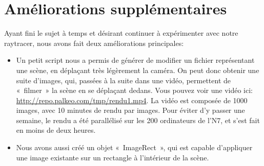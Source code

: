 \documentclass[a4paper]{article}
\begin{document}
\section{Améliorations supplémentaires}
Ayant fini le sujet à temps et désirant continuer à expérimenter avec notre raytracer, nous avons fait deux améliorations principales:
\begin{itemize}
    \item Un petit script nous a permis de générer de modifier un fichier représentant une scène, en déplaçant très légèrement la caméra.
              On peut donc obtenir une suite d'images, qui, passées à la suite dans une vidéo, permettent de «~filmer~» la scène en se déplaçant dedans.
              Vous pouvez voir une vidéo ici: \url{http://repo.palkeo.com/tmp/rendu1.mp4}.
              La vidéo est composée de 1000 images, avec 10 minutes de rendu par images. Pour éviter d'y passer une semaine, le rendu a été parallélisé sur les 200 ordinateurs de l'N7, et s'est fait en moins de deux heures.
    \item Nous avons aussi créé un objet «~ImageRect~», qui est capable d'appliquer une image existante sur un rectangle à l'intérieur de la scène.
\end{itemize}
\end{document}
